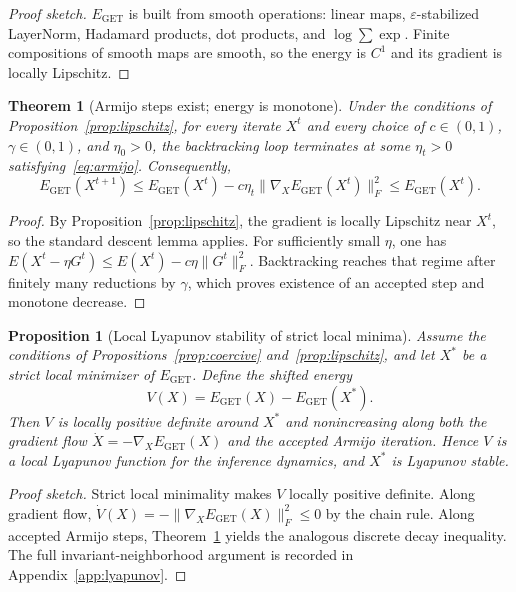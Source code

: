\documentclass[11pt,a4paper]{article}
\newtheorem{theorem}{Theorem}
\newtheorem{proposition}{Proposition}
\begin{document}
\begin{proof}[Proof sketch]
$E_{\mathrm{GET}}$ is built from smooth operations: linear maps,
$\varepsilon$-stabilized LayerNorm, Hadamard products, dot products, and
$\log\!\sum\exp$. Finite compositions of smooth maps are smooth, so the energy
is $C^1$ and its gradient is locally Lipschitz.
\end{proof}

\begin{theorem}[Armijo steps exist; energy is monotone]
\label{thm:monotone}
Under the conditions of Proposition~\ref{prop:lipschitz}, for every iterate
$X^t$ and every choice of $c\in(0,1)$, $\gamma\in(0,1)$, and $\eta_0>0$, the
backtracking loop terminates at some $\eta_t>0$ satisfying~\eqref{eq:armijo}.
Consequently,
\begin{equation}
  E_{\mathrm{GET}}(X^{t+1})
  \le E_{\mathrm{GET}}(X^t) - c\eta_t\|\nabla_X E_{\mathrm{GET}}(X^t)\|_F^2
  \le E_{\mathrm{GET}}(X^t).
\end{equation}
\end{theorem}

\begin{proof}
By Proposition~\ref{prop:lipschitz}, the gradient is locally Lipschitz near
$X^t$, so the standard descent lemma applies. For sufficiently small $\eta$,
one has $E(X^t-\eta G^t)\le E(X^t)-c\eta\|G^t\|_F^2$. Backtracking reaches
that regime after finitely many reductions by $\gamma$, which proves
existence of an accepted step and monotone decrease.
\end{proof}

\begin{proposition}[Local Lyapunov stability of strict local minima]
\label{prop:lyapunov}
Assume the conditions of Propositions~\ref{prop:coercive}
and~\ref{prop:lipschitz}, and let $X^*$ be a strict local minimizer of
$E_{\mathrm{GET}}$. Define the shifted energy
\begin{equation}
  V(X)=E_{\mathrm{GET}}(X)-E_{\mathrm{GET}}(X^*).
  \label{eq:lyapunov}
\end{equation}
Then $V$ is locally positive definite around $X^*$ and nonincreasing along
both the gradient flow $\dot X=-\nabla_X E_{\mathrm{GET}}(X)$ and the accepted
Armijo iteration. Hence $V$ is a local Lyapunov function for the inference
dynamics, and $X^*$ is Lyapunov stable.
\end{proposition}

\begin{proof}[Proof sketch]
Strict local minimality makes $V$ locally positive definite. Along gradient
flow, $\dot V(X)=-\|\nabla_X E_{\mathrm{GET}}(X)\|_F^2\le 0$ by the chain
rule. Along accepted Armijo steps, Theorem~\ref{thm:monotone} yields the
analogous discrete decay inequality. The full invariant-neighborhood argument
is recorded in Appendix~\ref{app:lyapunov}.
\end{proof}
\end{document}
